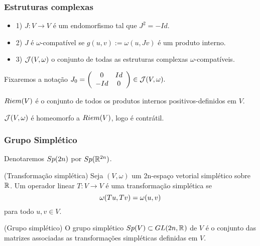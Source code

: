 \documentclass{beamer}
\begin{document}
	\begin{frame}
		\frametitle{Estruturas complexas}
		
		\begin{definicao}
			\begin{itemize}
				\item 1) $J: V \to V$ é um endomorfismo tal que $J^{2} = -Id$. 
				
				\item 2) $J$ é $\omega$-compatível se $g(u,v):=\omega(u, Jv)$ é um produto interno. 
				
				\item 3) $\mathcal{J}(V, \omega)$ o conjunto de todas as estruturas complexas $\omega$-compatíveis.
			\end{itemize}
		\end{definicao}
		
		Fixaremos a notação
		$
		J_{0}=
		\left(
		\begin{array}{cc}
		0 & Id
		\\
		-Id & 0
		\end{array}
		\right) \in \mathcal{J}(V, \omega) .
		$
		
		
		\begin{definicao}
			$Riem(V)$ é o conjunto de todos os produtos internos positivos-definidos em $V$.
		\end{definicao}
		
		\begin{proposicao}
			$\mathcal{J}(V, \omega)$ é homeomorfo a $Riem(V)$, logo é contrátil.
		\end{proposicao}
		
	\end{frame}
	
	\begin{frame}
		\frametitle{Grupo Simplético}
		
		Denotaremos $Sp(2n)$ por $Sp(\mathbb{R}^{2n})$.
		
		\begin{definicao}
			(Transformação simplética) Seja $(V, \omega)$ um 2n-espaço vetorial simplético sobre $\mathbb{R}^{}$. Um operador linear $T: V \to V$ é uma transformação simplética se 
			$$
			\omega(Tu, Tv) = \omega(u, v)
			$$ para todo $u,v\in V$.
		\end{definicao}
		
		\begin{definicao}
			(Grupo simplético) O grupo simplético $Sp(V) \subset GL(2n, \mathbb{R}^{})$ de $V$ é o conjunto das matrizes associadas as transformações simpléticas definidas em $V$.
		\end{definicao}	
	\end{frame}
	
\end{document}
